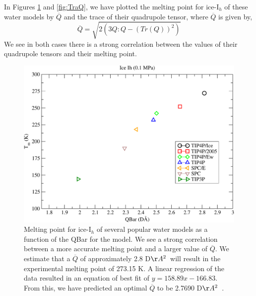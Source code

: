 In Figures \ref{fig:QBar} and \ref{fig:TraQ}, we have plotted the
melting point for ice-I$_h$ of these water models by $\overline{Q}$
and the trace of their quadrupole tensor, where $\overline{Q}$ is
given by,
\begin{equation}
\overline{Q} = \sqrt{2(3 Q:Q - (Tr(Q))^{2})}
\end{equation}
We see in both cases there is a strong correlation between
the values of their quadrupole tensors and their melting point.


\begin{figure}
\includegraphics[width=\linewidth]{Figures/Tm_Ih_Qbar_plot.pdf}
\caption{\label{fig:QBar} Melting point for ice-I$_h$ of several
  popular water models as a function of the QBar for the model. We see
  a strong correlation between a more accurate melting point and a
  larger value of $\overline{Q}$. We estimate that a $\overline{Q}$ of
  approximately 2.8 D$\AA^{2}$~will result in the experimental melting point
  of 273.15 K. A linear regression of the data resulted in an equation
  of best fit of $y = 158.89x - 166.83$. From this, we have predicted
  an optimal $\overline{Q}$ to be 2.7690 D$\AA^{2}$~.}
\end{figure}

